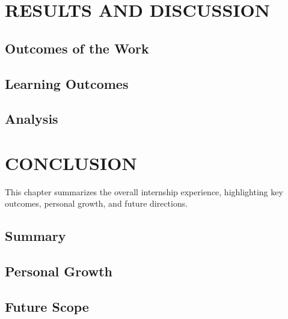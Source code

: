 \documentclass[12pt,a4paper]{report}
\begin{document}
\chapter{RESULTS AND DISCUSSION}
\label{ch:results}





\section{Outcomes of the Work}


\section{Learning Outcomes}


\section{Analysis}




\chapter{CONCLUSION}
\label{ch:conclusion}


This chapter summarizes the overall internship experience, highlighting key outcomes, personal growth, and future directions.




\section{Summary}


\section{Personal Growth}


\section{Future Scope}
\end{document}
